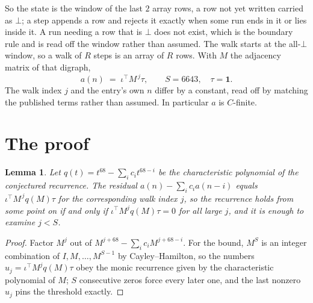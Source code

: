 \documentclass[11pt,a4paper]{article}
\theoremstyle{plain}
\newtheorem{lemma}[theorem]{Lemma}
\theoremstyle{definition}
\begin{document}
So the state is the window of the last $2$ array rows, a row not yet written carried as
$\bot$; a step appends a row and rejects it exactly when some run ends in it or lies inside it.
A run needing a row that is $\bot$ does not exist, which is the boundary rule and is read off
the window rather than assumed. The walk starts at the all-$\bot$ window, so a walk of $R$ steps
is an array of $R$ rows. With $M$ the adjacency matrix of that digraph,
\[
a(n)\;=\;\iota^{\!\top}M^{\,j}\tau ,\qquad S=6643,\quad\tau=\mathbf{1} .
\]
The walk index $j$ and the entry's own $n$ differ by a constant, read off by matching the
published terms rather than assumed. In particular $a$ is $C$-finite.

\section{The proof}

\begin{lemma}\label{lem:crit}
Let $q(t)=t^{68}-\sum_i c_it^{68-i}$ be the characteristic polynomial of the
conjectured recurrence. The residual $a(n)-\sum_ic_ia(n-i)$ equals
$\iota^{\!\top}M^{\,j}q(M)\tau$ for the corresponding walk index $j$, so the recurrence
holds from some point on if and only if $\iota^{\!\top}M^{j}q(M)\tau=0$ for all large $j$,
and it is enough to examine $j<S$.
\end{lemma}

\begin{proof}
Factor $M^{j}$ out of $M^{j+68}-\sum_ic_iM^{j+68-i}$. For the bound, $M^{S}$
is an integer combination of $I,M,\dots,M^{S-1}$ by Cayley--Hamilton, so the numbers
$u_j=\iota^{\!\top}M^{j}q(M)\tau$ obey the monic recurrence given by the characteristic
polynomial of $M$; $S$ consecutive zeros force every later one, and the last nonzero $u_j$
pins the threshold exactly.
\end{proof}
\end{document}
